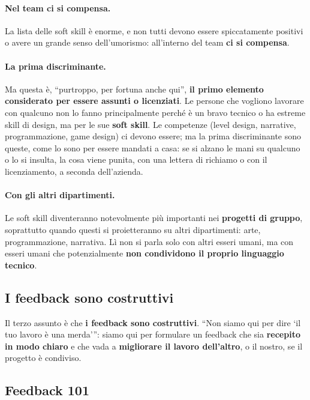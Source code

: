 \paragraph{Nel team ci si compensa.} La lista delle soft skill è enorme, e
non tutti devono essere spiccatamente positivi o avere un grande senso
dell'umorismo: all'interno del team \textbf{ci si compensa}.

\paragraph{La prima discriminante.} Ma questa è, ``purtroppo, per fortuna
anche qui'', \textbf{il primo elemento considerato per essere assunti o
licenziati}. Le persone che vogliono lavorare con qualcuno non lo fanno
principalmente perché è un bravo tecnico o ha estreme skill di design, ma
per le sue \textbf{soft skill}. Le competenze (level design, narrative,
programmazione, game design) ci devono essere; ma la prima discriminante
sono queste, come lo sono per essere mandati a casa: se si alzano le mani su
qualcuno o lo si insulta, la cosa viene punita, con una lettera di richiamo
o con il licenziamento, a seconda dell'azienda.

\paragraph{Con gli altri dipartimenti.} Le soft skill diventeranno
notevolmente più importanti nei \textbf{progetti di gruppo}, soprattutto
quando questi si proietteranno su altri dipartimenti: arte, programmazione,
narrativa. Lì non si parla solo con altri esseri umani, ma con esseri umani
che potenzialmente \textbf{non condividono il proprio linguaggio tecnico}.

\subsection{I feedback sono costruttivi}

Il terzo assunto è che \textbf{i feedback sono costruttivi}. ``Non siamo qui
per dire `il tuo lavoro è una merda'{}'': siamo qui per formulare un feedback
che sia \textbf{recepito in modo chiaro} e che vada a \textbf{migliorare il
lavoro dell'altro}, o il nostro, se il progetto è condiviso.

\subsection{Feedback 101}

